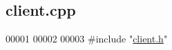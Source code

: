 \hypertarget{client_8cpp_source}{}\subsection{client.\+cpp}

\begin{DoxyCode}
00001 
00002 
00003 \textcolor{preprocessor}{#include "\hyperlink{client_8h}{client.h}"}
\end{DoxyCode}
